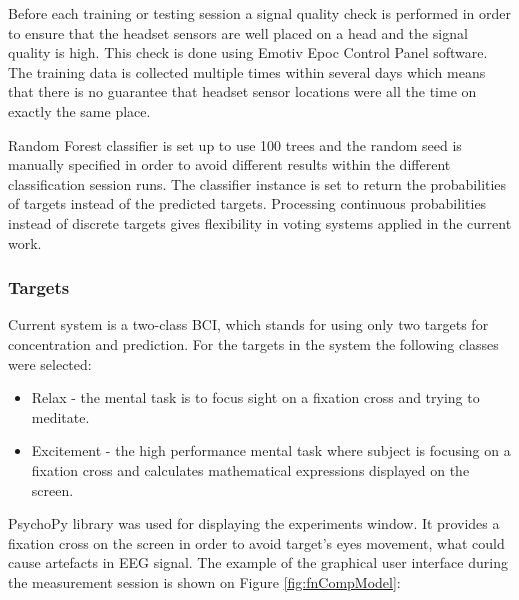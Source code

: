 \documentclass[12pt]{article}
\theoremstyle{definition}
\begin{document}
Before each training or testing session a signal quality check is performed in order to ensure that the headset sensors are well placed on a head and the signal quality is high. This check is done using Emotiv Epoc Control Panel software. The training data is collected multiple times within several days which means that there is no guarantee that headset sensor locations were all the time on exactly the same place. 

Random Forest classifier is set up to use 100 trees and the random seed is manually specified in order to avoid different results within the different classification session runs. The classifier instance is set to return the probabilities of targets instead of the predicted targets. Processing continuous probabilities instead of discrete targets gives flexibility in voting systems applied in the current work.

\subsubsection{Targets}
Current system is a two-class BCI, which stands for using only two targets for concentration and prediction. For the targets in the system the following classes were selected: 
\begin{itemize}
\item Relax - the mental task is to focus sight on a fixation cross and trying to meditate.
\item Excitement - the high performance mental task where subject is focusing on a fixation cross and calculates mathematical expressions displayed on the screen.
\end{itemize}

PsychoPy \cite{psychopy} library was used for displaying the experiments window. It provides a fixation cross on the screen in order to avoid target's eyes movement, what could cause artefacts in EEG signal. The example of the graphical user interface during the measurement session is shown on Figure \ref{fig:fnCompModel}:
\end{document}
